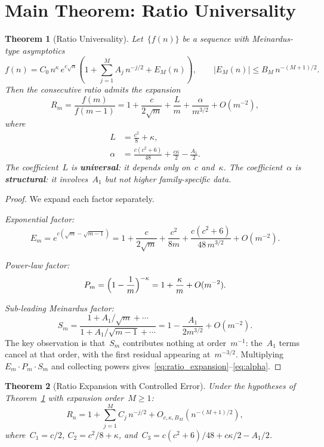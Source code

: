 \documentclass[11pt,a4paper]{article}
\newtheorem{theorem}{Theorem}[section]
\begin{document}
\section{Main Theorem: Ratio Universality}\label{sec:main}

\begin{theorem}[Ratio Universality]\label{thm:ratio}
Let~$\{f(n)\}$ be a sequence with Meinardus-type asymptotics
\[
  f(n) = C_0\,n^{\kappa}\,e^{c\sqrt{n}}\!\left(1 + \sum_{j=1}^{M} A_j\,n^{-j/2} + E_M(n)\right),
  \qquad |E_M(n)| \leq B_M\,n^{-(M+1)/2}.
\]
Then the consecutive ratio admits the expansion
\begin{equation}\label{eq:ratio_expansion}
  R_m = \frac{f(m)}{f(m-1)} = 1 + \frac{c}{2\sqrt{m}} + \frac{L}{m} + \frac{\alpha}{m^{3/2}} + O(m^{-2}),
\end{equation}
where
\begin{align}
  L &= \frac{c^2}{8} + \kappa, \label{eq:L}\\[4pt]
  \alpha &= \frac{c(c^2+6)}{48} + \frac{c\kappa}{2} - \frac{A_1}{2}. \label{eq:alpha}
\end{align}
The coefficient~$L$ is \textbf{universal}: it depends only on~$c$ and~$\kappa$.
The coefficient~$\alpha$ is \textbf{structural}: it involves~$A_1$ but not higher family-specific data.
\end{theorem}

\begin{proof}
We expand each factor separately.

\emph{Exponential factor:}
\[
  E_m = e^{c(\sqrt{m}-\sqrt{m-1})} = 1 + \frac{c}{2\sqrt{m}} + \frac{c^2}{8m} + \frac{c(c^2+6)}{48\,m^{3/2}} + O(m^{-2}).
\]

\emph{Power-law factor:}
\[
  P_m = \Bigl(1 - \frac{1}{m}\Bigr)^{-\kappa} = 1 + \frac{\kappa}{m} + O(m^{-2}).
\]

\emph{Sub-leading Meinardus factor:}
\[
  S_m = \frac{1 + A_1/\sqrt{m} + \cdots}{1 + A_1/\sqrt{m-1} + \cdots} = 1 - \frac{A_1}{2m^{3/2}} + O(m^{-2}).
\]
The key observation is that~$S_m$ contributes nothing at order~$m^{-1}$: the~$A_1$ terms cancel at that order, with the first residual appearing at~$m^{-3/2}$. Multiplying~$E_m \cdot P_m \cdot S_m$ and collecting powers gives~\eqref{eq:ratio_expansion}--\eqref{eq:alpha}.
\end{proof}

\begin{theorem}[Ratio Expansion with Controlled Error]\label{thm:ratio_prime}
Under the hypotheses of Theorem~\ref{thm:ratio} with expansion order~$M \geq 1$:
\begin{equation}\label{eq:ratio_M}
  R_n = 1 + \sum_{j=1}^{M} C_j\,n^{-j/2} + O_{c,\kappa,B_M}\!\left(n^{-(M+1)/2}\right),
\end{equation}
where~$C_1 = c/2$, $C_2 = c^2/8 + \kappa$, and~$C_3 = c(c^2+6)/48 + c\kappa/2 - A_1/2$.
\end{theorem}
\end{document}
